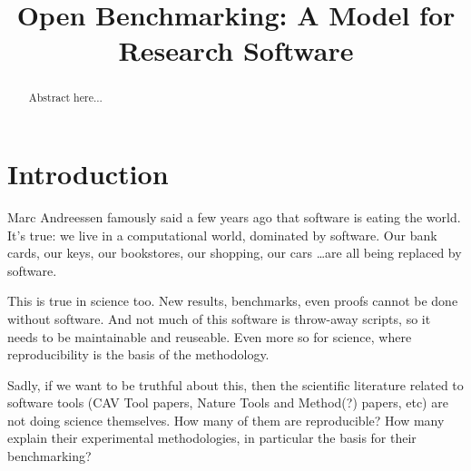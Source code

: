 \documentclass[conference]{IEEEtran}
\begin{document}

\title{Open Benchmarking: A Model for Research Software}

\author{
\and
{}
\and
{}
 }

\maketitle

\begin{abstract}
Abstract here...
\end{abstract}

\IEEEpeerreviewmaketitle

\section{Introduction}

Marc Andreessen famously said a few years ago that software is eating
the world. It's true: we live in a computational world, dominated by
software. Our bank cards, our keys, our bookstores, our shopping, our
cars \dots are all being replaced by software.

This is true in science too. New results, benchmarks, even proofs
cannot be done without software. And not much of this software is
throw-away scripts, so it needs to be maintainable and reuseable. Even
more so for science, where reproducibility is the basis of the
methodology.

Sadly, if we want to be truthful about this, then the scientific
literature related to software tools (CAV Tool papers, Nature Tools
and Method(?)  papers, etc) are not doing science themselves. How many
of them are reproducible? How many explain their experimental
methodologies, in particular the basis for their benchmarking?
\end{document}
